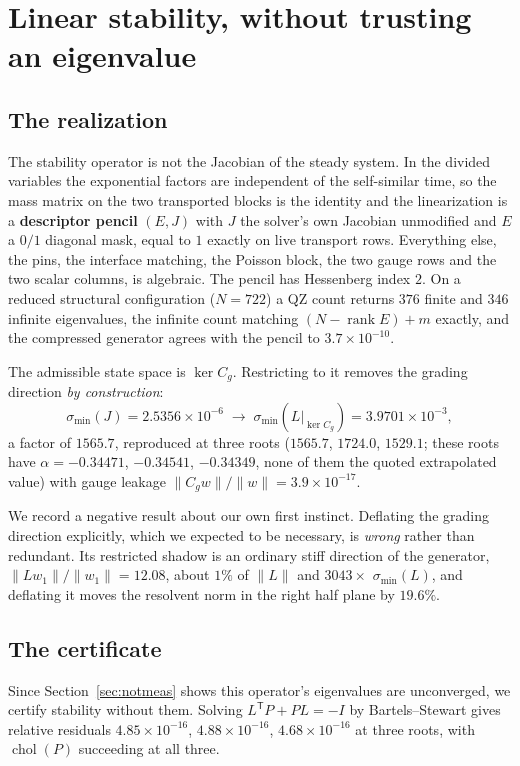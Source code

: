 \documentclass[11pt]{article}
\begin{document}
\section{Linear stability, without trusting an eigenvalue}

\subsection{The realization}

The stability operator is not the Jacobian of the steady system. In the divided variables
the exponential factors are independent of the self-similar time, so the mass matrix on
the two transported blocks is the identity and the linearization is a \textbf{descriptor
pencil} $(E, J)$ with $J$ the solver's own Jacobian unmodified and $E$ a $0/1$ diagonal
mask, equal to $1$ exactly on live transport rows. Everything else, the pins, the
interface matching, the Poisson block, the two gauge rows and the two scalar columns, is
algebraic. The pencil has Hessenberg index $2$. On a reduced structural configuration
($N = 722$) a QZ count returns $376$ finite and $346$ infinite eigenvalues, the infinite
count matching $(N - \operatorname{rank}E) + m$ exactly, and the compressed generator
agrees with the pencil to $3.7\times10^{-10}$.

The admissible state space is $\ker C_g$. Restricting to it removes the grading direction
\emph{by construction}:
\[
  \sigma_{\min}(J) = 2.5356\times10^{-6}
  \;\longrightarrow\;
  \sigma_{\min}\!\left(L\big|_{\ker C_g}\right) = 3.9701\times10^{-3},
\]
a factor of $1565.7$, reproduced at three roots ($1565.7$, $1724.0$, $1529.1$; these
roots have $\alpha = -0.34471$, $-0.34541$, $-0.34349$, none of them the quoted
extrapolated value) with gauge leakage $\|C_g w\|/\|w\| = 3.9\times10^{-17}$.

We record a negative result about our own first instinct. Deflating the grading direction
explicitly, which we expected to be necessary, is \emph{wrong} rather than redundant. Its
restricted shadow is an ordinary stiff direction of the generator,
$\|Lw_1\|/\|w_1\| = 12.08$, about $1\%$ of $\|L\|$ and $3043\times$ $\sigma_{\min}(L)$,
and deflating it moves the resolvent norm in the right half plane by $19.6\%$.

\subsection{The certificate}

Since Section~\ref{sec:notmeas} shows this operator's eigenvalues are unconverged, we
certify stability without them. Solving $L^{\mathsf T}P + PL = -I$ by Bartels--Stewart
gives relative residuals $4.85\times10^{-16}$, $4.88\times10^{-16}$,
$4.68\times10^{-16}$ at three roots, with $\operatorname{chol}(P)$ succeeding at all
three.
\end{document}
